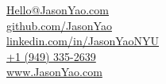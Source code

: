 \documentclass[]{two-column-resume}
\begin{document}
{
\large  %
{}
	\faEnvelope \hspace{0.1cm} \href{mailto:Hello@JasonYao.com}{Hello@JasonYao.com}\\
	\faGithub \hspace{0.1cm} \href{https://github.com/JasonYao}{github.com/JasonYao}\\
	\faLinkedinSquare \hspace{0.1cm} \href{https://www.linkedin.com/in/JasonYaoNYU/}{linkedin.com/in/JasonYaoNYU}\\
    \faPhone \hspace{0.1cm} \href{tel:19493352639}{+1 (949) 335-2639} \\
    \faGlobe \hspace{0.1cm} \href{https://www.JasonYao.com}{www.JasonYao.com}
}
\end{document}
